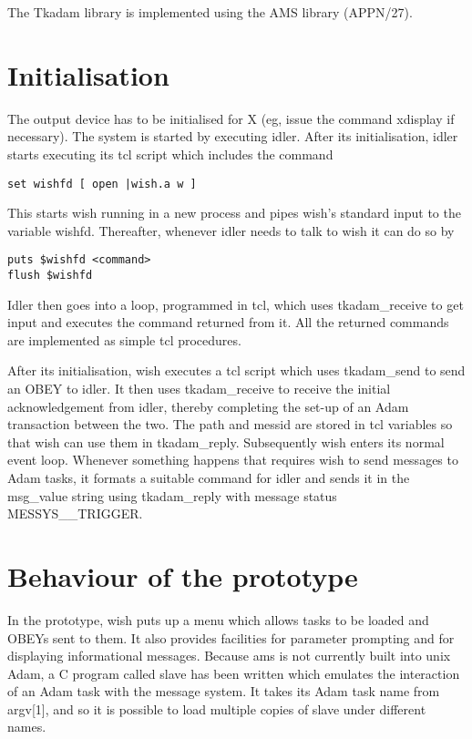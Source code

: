The Tkadam library is implemented using the AMS library (APPN/27).

\section {Initialisation}

The output device has to be initialised for X (eg, issue the command
xdisplay if necessary).
The system is started by executing idler. After its initialisation, idler
starts executing its tcl script which includes the command

\begin{verbatim}
set wishfd [ open |wish.a w ]
\end{verbatim}

This starts wish running in a new process and pipes wish's standard input
to the variable wishfd. Thereafter, whenever idler needs to talk to wish
it can do so by

\begin{verbatim}
puts $wishfd <command>
flush $wishfd
\end{verbatim}

Idler then goes into a loop, programmed in tcl, which uses
tkadam\_receive to get input and executes the command returned from it.
All the returned commands are implemented as simple tcl procedures.

After its initialisation, wish executes a tcl script which uses
tkadam\_send to send an OBEY to idler. It then uses tkadam\_receive to
receive the initial acknowledgement from idler, thereby completing the
set-up of an Adam transaction between the two. The path and messid are
stored in tcl variables so that wish can use them in tkadam\_reply.
Subsequently wish enters its normal event loop. Whenever something
happens that requires wish to send messages to Adam tasks, it formats a
suitable command for idler and sends it in the msg\_value string using
tkadam\_reply with message status MESSYS\_\_TRIGGER.


\section {Behaviour of the prototype}

In the prototype, wish puts up a menu which allows tasks to be loaded and
OBEYs sent to them. It also provides facilities for parameter prompting
and for displaying informational messages. Because ams is not currently
built into unix Adam, a C program called slave has been written which
emulates the interaction of an Adam task with the message system. It
takes its Adam task name from argv[1], and so it is possible to load
multiple copies of slave under different names.


